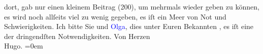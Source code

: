                dort, gab nur einen kleinem Beitrag \introOben{}(200)\introOben{}, um mehrmals
               wieder geben zu können, es wird noch allſeits viel zu wenig gegeben, es iſt ein Meer
               von Not und Schwierigkeiten.\pend
           \pstart
           Ich bitte Sie und \textcolor{blue}{Olga}{}\ledrightnote{\textcolor{blue}{Olga Schnitzler}}, dies unter Euren Bekannten
                  \label{K_L02196_2v}\label{K_L02196_2h}, es iſt eine der dringendſten Notwendigkeiten.\pend
           \pstart
           Von Herzen{\\[\baselineskip]}\spacefill\mbox{Hugo.}\pend
           \leftskip=0em{}\endnumbering{}  
      